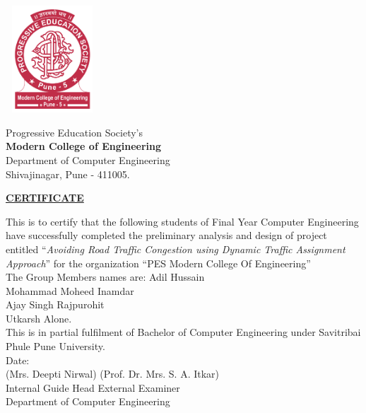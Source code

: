 \documentclass[12pt,a4paper,final]{report}
\begin{document}
\thispagestyle{empty}
\vspace*{1.3cm}
\begin{center}
\includegraphics[width=3.5cm, height=4.0cm]{logo.png}
\end{center}
\begin{center}
\Large
Progressive Education Society's \\
\textbf{Modern College of Engineering} \\
Department of Computer Engineering\\
Shivajinagar, Pune - 411005. \\
\vspace{1cm}

\underline{\textbf{CERTIFICATE}}
\end{center}
\normalsize
\vspace{0.5cm}
This is to certify that the following students of Final Year Computer Engineering have successfully completed the preliminary analysis and design of project entitled ``\emph{Avoiding Road Traffic Congestion using Dynamic Traffic Assignment Approach}'' for the organization ``PES Modern College Of Engineering'' \\
The Group Members names are: \hspace{0.1cm} Adil Hussain \\
\hspace*{5.7cm} Mohammad Moheed Inamdar \\
\hspace*{5.7cm} Ajay Singh Rajpurohit \\
\hspace*{5.7cm} Utkarsh Alone. \vspace{0.5cm}\\
This is in partial fulfilment of Bachelor of Computer Engineering under Savitribai Phule Pune University. \vspace{1cm}\\
Date: \vspace{1cm} \\
(Mrs. Deepti Nirwal)
\hspace*{2.5cm}(Prof. Dr. Mrs. S. A. Itkar) \\
\hspace*{0.5cm}Internal Guide 	 
\hspace{4.5cm}Head
\hspace{5.5cm}External Examiner \\
\hspace*{4.5cm}Department of Computer Engineering \\
\end{document}
